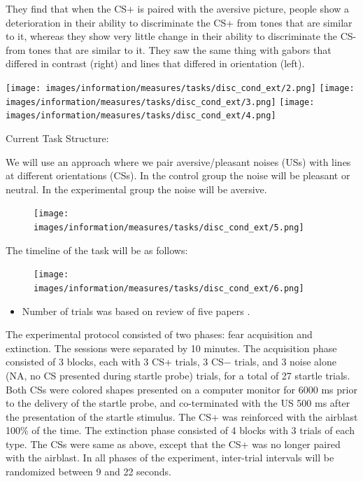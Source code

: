 \documentclass[
]{book}
\providecommand{\tightlist}{%
  \setlength{\itemsep}{0pt}\setlength{\parskip}{0pt}}
\begin{document}
They find that when the CS+ is paired with the aversive picture, people show a deterioration in their ability to discriminate the CS+ from tones that are similar to it, whereas they show very little change in their ability to discriminate the CS- from tones that are similar to it. They saw the same thing with gabors that differed in contrast (right) and lines that differed in orientation (left).

\texttt{[image: images/information/measures/tasks/disc\_cond\_ext/2.png]}
\texttt{[image: images/information/measures/tasks/disc\_cond\_ext/3.png]}
\texttt{[image: images/information/measures/tasks/disc\_cond\_ext/4.png]}

Current Task Structure:

We will use an approach where we pair aversive/pleasant noises (USs) with lines at different orientations (CSs). In the control group the noise will be pleasant or neutral. In the experimental group the noise will be aversive.

\begin{figure}
\centering
\texttt{[image: images/information/measures/tasks/disc\_cond\_ext/5.png]}
\caption{}
\end{figure}

The timeline of the task will be as follows:

\begin{figure}
\centering
\texttt{[image: images/information/measures/tasks/disc\_cond\_ext/6.png]}
\caption{}
\end{figure}

\begin{itemize}
\tightlist
\item
  Number of trials was based on review of five papers \citetext{\citealp[ (56 trials)]{norrholm_2011}; \citealp[ (72 trials)]{norrholm_2006}; \citealp[ (32 trials)]{schiller_2013}; \citealp[ (34 trials)]{phelps_2004}; \citealp{jovanovic_2014}}.
\end{itemize}

The experimental protocol consisted of two phases: fear acquisition and extinction. The sessions were separated by 10 minutes. The acquisition phase consisted of 3 blocks, each with 3 CS+ trials, 3 CS− trials, and 3 noise alone (NA, no CS presented during startle probe) trials, for a total of 27 startle trials. Both CSs were colored shapes presented on a computer monitor for 6000 ms prior to the delivery of the startle probe, and co-terminated with the US 500 ms after the presentation of the startle stimulus. The CS+ was reinforced with the airblast 100\% of the time. The extinction phase consisted of 4 blocks with 3 trials of each type. The CSs were same as above, except that the CS+ was no longer paired with the airblast. In all phases of the experiment, inter-trial intervals will be randomized between 9 and 22 seconds.
\end{document}
